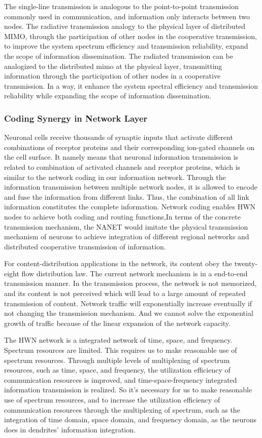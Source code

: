 \documentclass[journal,comsoc]{IEEEtran}
\begin{document}
	The single-line transmission is analogous to the point-to-point transmission commonly used in communication, and information only interacts between two nodes.
	The radiative transmission analogy to the physical layer of distributed MIMO, through the participation of other nodes in the cooperative transmission, to improve the system spectrum efficiency and transmission reliability, expand the scope of information dissemination.
	The radiated transmission can be analogized to the distributed mimo at the physical layer, transmitting information through the participation of other nodes in a cooperative transmission.
	In a way, it enhance the system spectral efficiency and transmission reliability while expanding the scope of information dissemination.
	
	\subsubsection{Coding Synergy in Network Layer}
	Neuronal cells receive thousands of synaptic inputs that activate different combinations of receptor proteins and their corresponding ion-gated channels on the cell surface.
	It namely means that neuronal information transmission is related to combination of activated channels and receptor proteins, which is similar to the network coding in our information network. 
	Through the information transmission between multiple network nodes, it is allowed to encode and fuse the information from different links. 
	Thus, the combination of all link information constitutes the complete information.
	Network coding enables HWN nodes to achieve both coding and routing functions,In terms of the concrete transmission mechanism, the NANET would imitate the physical transmission mechanism of neurons 
	to achieve integration of different regional networks and distributed cooperative transmission of information.
	
	For content-distribution applications in the network, its content obey the twenty-eight flow distribution law.
	The current network mechanism is in a end-to-end transmission manner. 
	In the transmission process, the network is not memorized, and its content is not perceived which will lead to a large amount of repeated transmission of content.
	Network traffic will exponentially increase eventually if not changing the transmission mechanism. 
	And we cannot solve the exponential growth of traffic because of the linear expansion of the network capacity.
	
	The HWN network is a integrated network of time, space, and frequency.
	Spectrum resources are limited. This requires us to make reasonable use of spectrum resources.
	Through multiple levels of multiplexing of spectrum resources, such as time, space, and frequency, the utilization efficiency of communication resources is improved, and time-space-frequency integrated information transmission is realized.
	So it's necessary for us to make reasonable use of spectrum resources, and to increase the utilization efficiency of communication resources through the multiplexing of spectrum, such as the integration of time domain, space domain, and frequency domain, as the neurons does in dendrites' information integration.
	
\end{document}
